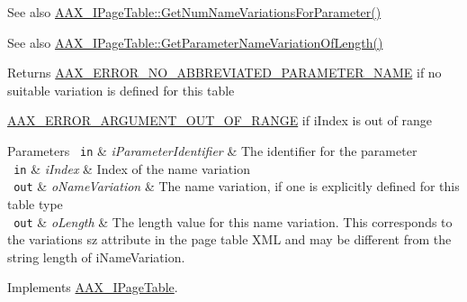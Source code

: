 \begin{DoxyItemize}
\item \begin{DoxySeeAlso}{See also}
\mbox{\hyperlink{a01849_af8be797a3ec7ed3117e720dd29ea7cc7}{A\+A\+X\+\_\+\+I\+Page\+Table\+::\+Get\+Num\+Name\+Variations\+For\+Parameter()}}
\end{DoxySeeAlso}

\item \begin{DoxySeeAlso}{See also}
\mbox{\hyperlink{a01849_a6ddd61f6ba18b8be8141363d5234ed9d}{A\+A\+X\+\_\+\+I\+Page\+Table\+::\+Get\+Parameter\+Name\+Variation\+Of\+Length()}}
\end{DoxySeeAlso}
\begin{DoxyReturn}{Returns}
\mbox{\hyperlink{a00494_a5f8c7439f3a706c4f8315a9609811937ab7383b0169f6dfa5f86b1fefd6c58ae2}{A\+A\+X\+\_\+\+E\+R\+R\+O\+R\+\_\+\+N\+O\+\_\+\+A\+B\+B\+R\+E\+V\+I\+A\+T\+E\+D\+\_\+\+P\+A\+R\+A\+M\+E\+T\+E\+R\+\_\+\+N\+A\+ME}} if no suitable variation is defined for this table

\mbox{\hyperlink{a00494_a5f8c7439f3a706c4f8315a9609811937a8dd2fdd469583a046765eae9178678a3}{A\+A\+X\+\_\+\+E\+R\+R\+O\+R\+\_\+\+A\+R\+G\+U\+M\+E\+N\+T\+\_\+\+O\+U\+T\+\_\+\+O\+F\+\_\+\+R\+A\+N\+GE}} if {\ttfamily i\+Index} is out of range
\end{DoxyReturn}

\begin{DoxyParams}[1]{Parameters}
\mbox{\texttt{ in}}  & {\em i\+Parameter\+Identifier} & The identifier for the parameter \\
\hline
\mbox{\texttt{ in}}  & {\em i\+Index} & Index of the name variation \\
\hline
\mbox{\texttt{ out}}  & {\em o\+Name\+Variation} & The name variation, if one is explicitly defined for this table type \\
\hline
\mbox{\texttt{ out}}  & {\em o\+Length} & The length value for this name variation. This corresponds to the variation\textquotesingle{}s {\ttfamily sz} attribute in the page table X\+ML and may be different from the string length of {\ttfamily i\+Name\+Variation}. \\
\hline
\end{DoxyParams}

\end{DoxyItemize}

Implements \mbox{\hyperlink{a01849_adffe5a5f2ad548bd4c704508d816d568}{A\+A\+X\+\_\+\+I\+Page\+Table}}.

